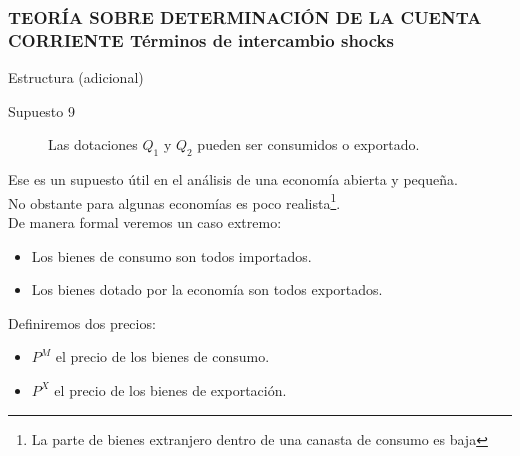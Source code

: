 \documentclass[10pt, xcolor=table, x11names]{beamer}
\begin{document}
\begin{frame}[label=11]
	\frametitle{{\normalsize TEORÍA SOBRE DETERMINACIÓN DE LA CUENTA CORRIENTE} {Términos de intercambio shocks}}
	\begin{block} {Estructura (adicional)}
		\begin{description}
			\item[Supuesto 9] Las dotaciones $Q_{1}$ y $ Q_{2}$ pueden ser consumidos o exportado. 
		\end{description}
	\end{block}	
	Ese es un supuesto útil en el análisis de una economía abierta y pequeña.\\ No obstante para algunas economías es poco realista\footnote{La parte de bienes extranjero dentro de una canasta de consumo es baja}. \\
	De manera formal veremos un caso extremo:
	\begin{itemize}
		\item Los bienes de consumo son todos importados.
		\item Los bienes dotado por la economía son todos exportados.
	\end{itemize}
	Definiremos dos precios:
	\begin{itemize}
		\item $P^{M} $ el precio de los  bienes de consumo.
		\item $P^{X} $ el precio de los  bienes de exportación.
	\end{itemize}
\end{frame}
\end{document}
